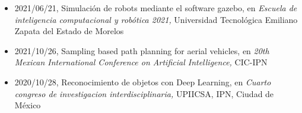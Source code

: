 \begin{itemize} 
\item 2021/06/21, Simulación de robots mediante el software gazebo, en \textit{ Escuela de inteligencia computacional y robótica 2021,} Universidad Tecnológica Emiliano Zapata del Estado de Morelos 
\item 2021/10/26, Sampling based path planning for aerial vehicles, en \textit{ 20th Mexican International Conference on Artificial Intelligence,} CIC-IPN 
\item 2020/10/28, Reconocimiento de objetos con Deep Learning, en \textit{ Cuarto congreso de investigacion interdisciplinaria,} UPIICSA, IPN, Ciudad de México 
\end{itemize} 
